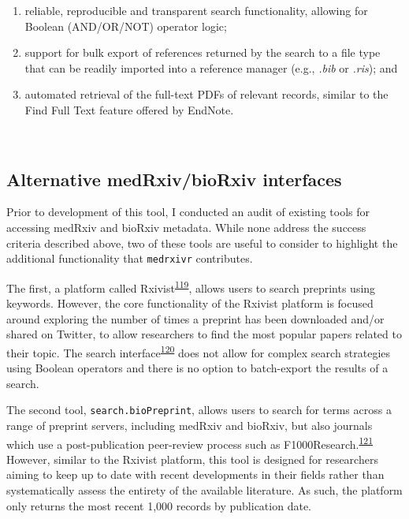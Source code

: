 \documentclass[a4paper, twoside]{templates/ociamthesis}
\begin{document}
\begin{enumerate}
\def\labelenumi{\arabic{enumi}.}
\item
  reliable, reproducible and transparent search functionality, allowing for Boolean (AND/OR/NOT) operator logic;
\item
  support for bulk export of references returned by the search to a file type that can be readily imported into a reference manager (e.g., \emph{.bib} or \emph{.ris}); and
\item
  automated retrieval of the full-text PDFs of relevant records, similar to the Find Full Text feature offered by EndNote.
\end{enumerate}

~

\hypertarget{alternative-medrxivbiorxiv-interfaces}{%
\subsection{Alternative medRxiv/bioRxiv interfaces}\label{alternative-medrxivbiorxiv-interfaces}}

Prior to development of this tool, I conducted an audit of existing tools for accessing medRxiv and bioRxiv metadata. While none address the success criteria described above, two of these tools are useful to consider to highlight the additional functionality that \texttt{medrxivr} contributes.

The first, a platform called Rxivist\textsuperscript{\protect\hyperlink{ref-abdill2019}{119}}, allows users to search preprints using keywords. However, the core functionality of the Rxivist platform is focused around exploring the number of times a preprint has been downloaded and/or shared on Twitter, to allow researchers to find the most popular papers related to their topic. The search interface\textsuperscript{\protect\hyperlink{ref-zotero-15027}{120}} does not allow for complex search strategies using Boolean operators and there is no option to batch-export the results of a search.

The second tool, \texttt{search.bioPreprint}, allows users to search for terms across a range of preprint servers, including medRxiv and bioRxiv, but also journals which use a post-publication peer-review process such as F1000Research.\textsuperscript{\protect\hyperlink{ref-iwema2016}{121}} However, similar to the Rxivist platform, this tool is designed for researchers aiming to keep up to date with recent developments in their fields rather than systematically assess the entirety of the available literature. As such, the platform only returns the most recent 1,000 records by publication date.
\end{document}
